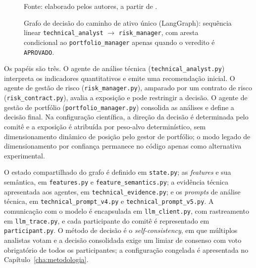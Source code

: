 \begin{figure}[htbp]
\centering
{}
\caption{Grafo de decisão do caminho de ativo único (LangGraph): sequência linear \texttt{technical\_analyst} $\rightarrow$ \texttt{risk\_manager}, com aresta condicional ao \texttt{portfolio\_manager} apenas quando o veredito é \texttt{APROVADO}.}
\label{fig:grafo-langgraph}
{\footnotesize Fonte: elaborado pelos autores, a partir de .}
\end{figure}

Os papéis são três. O agente de análise técnica (\texttt{technical\_analyst.py}) interpreta os indicadores quantitativos e emite uma recomendação inicial. O agente de gestão de risco (\texttt{risk\_manager.py}), amparado por um contrato de risco (\texttt{risk\_contract.py}), avalia a exposição e pode restringir a decisão. O agente de gestão de portfólio (\texttt{portfolio\_manager.py}) consolida as análises e define a decisão final. Na configuração científica, a direção da decisão é determinada pelo comitê e a exposição é atribuída por peso-alvo determinístico, sem dimensionamento dinâmico de posição pelo gestor de portfólio; o modo legado de dimensionamento por confiança permanece no código apenas como alternativa experimental.

O estado compartilhado do grafo é definido em \texttt{state.py}; as \textit{features} e sua semântica, em \texttt{features.py} e \texttt{feature\_semantics.py}; a evidência técnica apresentada aos agentes, em \texttt{technical\_evidence.py}; e os \textit{prompts} de análise técnica, em \texttt{technical\_prompt\_v4.py} e \texttt{technical\_prompt\_v5.py}. A comunicação com o modelo é encapsulada em \texttt{llm\_client.py}, com rastreamento em \texttt{llm\_trace.py}, e cada participante do comitê é representado em \texttt{participant.py}. O método de decisão é o \textit{self-consistency}, em que múltiplos analistas votam e a decisão consolidada exige um limiar de consenso com voto obrigatório de todos os participantes; a configuração congelada é apresentada no Capítulo~\ref{cha:metodologia}.

